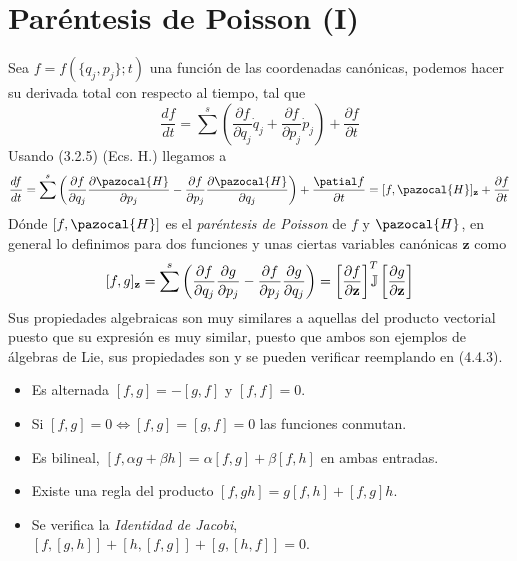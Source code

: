 \section{Paréntesis de Poisson (I)} 
Sea $f=f(\{q_j,p_j\};t)$ una función de las coordenadas canónicas, podemos hacer su derivada total con respecto al tiempo, tal que
\begin{equation} \label{4.4.1}
    \frac{d f}{dt} = \sum^s \left(\frac{\partial f}{\partial q_j}\dot{q}_j+\frac{\partial f}{\partial p_j}\dot{p}_j\right) + \frac{\partial f}{\partial t}
\end{equation} 
Usando (3.2.5) (Ecs. H.) llegamos a 
\begin{equation} \label{4.4.2}
\frac{d f}{dt} = \sum^s \left(\frac{\partial f}{\partial q_j}\frac{\partial \pazocal{H}}{\partial p_j}-\frac{\partial f}{\partial p_j}\frac{\partial \pazocal{H}}{\partial q_j}\right) + \frac{\patial f}{\partial t} = [f,\pazocal{H}]_\mathbf{z} + \frac{\partial f}{\partial t}
\end{equation} 
Dónde $[f,\pazocal{H}]$ es el \textit{paréntesis de Poisson} de $f$ y $\pazocal{H}$, en general lo definimos para dos funciones y unas ciertas variables canónicas $\mathbf{z}$ como
\begin{equation} \label{4.4.3}
    [f,g]_\mathbf{z}=  \sum^s \left(\frac{\partial f}{\partial q_j}\frac{\partial g}{\partial p_j}-\frac{\partial f}{\partial p_j}\frac{\partial g}{\partial q_j}\right) = \left[\frac{\partial f}{\partial \mathbf{z}}\right]^T \hspace{-7pt} \mathbb{J} \left[\frac{\partial g}{\partial \mathbf{z}}\right]
\end{equation} 
Sus propiedades algebraicas son muy similares a aquellas del producto vectorial puesto que su expresión es muy similar, puesto que ambos son ejemplos de álgebras de Lie, sus propiedades son y se pueden verificar reemplando en (4.4.3).
\begin{itemize}
    \item Es alternada $[f,g]=-[g,f]$ y $[f,f]=0$.
    \item Si $[f,g]=0 \iff [f,g]=[g,f]=0$ las funciones conmutan.
    \item Es bilineal, $[f,\alpha g + \beta h] = \alpha [f,g] + \beta [f,h]$ en ambas entradas.
    \item Existe una regla del producto $[f,gh]=g[f,h]+[f,g]h$.
    \item Se verifica la \textit{Identidad de Jacobi}, $\left[f,[g,h]\right]+\left[h,[f,g]\right]+\left[g,[h,f]\right]=0$.
\end{itemize}

